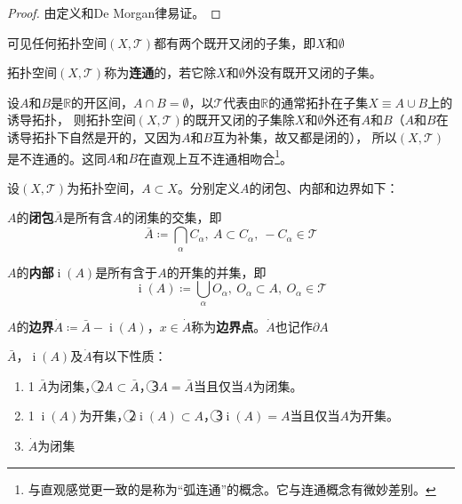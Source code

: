 \begin{proof}
	由定义和De Morgan律易证。
\end{proof}

可见任何拓扑空间$(X, \mathscr{T})$都有两个既开又闭的子集，即$X$和$\emptyset$

\begin{definition}
	拓扑空间$(X, \mathscr{T})$称为\textbf{连通}的，若它除$X$和$\emptyset$外没有既开又闭的子集。
\end{definition}

\begin{example}
	设$A$和$B$是$\mathbb{R}$的开区间，$A \cap B = \emptyset$，以$\mathscr{T}$代表由$\mathbb{R}$的通常拓扑在子集$X \equiv A \cup B$上的诱导拓扑，
	则拓扑空间$(X, \mathscr{T})$的既开又闭的子集除$X$和$\emptyset$外还有$A$和$B$（$A$和$B$在诱导拓扑下自然是开的，又因为$A$和$B$互为补集，故又都是闭的），
	所以$(X, \mathscr{T})$是不连通的。这同$A$和$B$在直观上互不连通相吻合\footnote{
		与直观感觉更一致的是称为``弧连通''的概念。它与连通概念有微妙差别。
	}。
\end{example}

设$(X, \mathscr{T})$为拓扑空间，$A \subset X$。分别定义$A$的闭包、内部和边界如下：

\begin{definition}
	$A$的\textbf{闭包}$\bar{A}$是所有含$A$的闭集的交集，即
	$$\bar{A} \coloneq \bigcap_\alpha C_\alpha, ~ A \subset C_\alpha, ~ -C_\alpha \in \mathscr{T}$$
\end{definition}

\begin{definition}
	$A$的\textbf{内部}$\operatorname{i}(A)$是所有含于$A$的开集的并集，即
	$$\operatorname{i}(A) \coloneq \bigcup_\alpha O_\alpha, ~ O_\alpha \subset A, ~ O_\alpha \in \mathscr{T}$$
\end{definition}

\begin{definition}
	$A$的\textbf{边界}$\dot{A} \coloneq \bar{A} - \operatorname{i}(A)$，$x \in \dot{A}$称为\textbf{边界点}。$\dot{A}$也记作$\partial A$
\end{definition}

\begin{theorem}
	$\bar{A}$，$\operatorname{i}(A)$及$\dot{A}$有以下性质：
	\begin{enumerate}[（a）]
		\item \textcircled{1}$\bar{A}$为闭集，\textcircled{2}$A \subset \bar{A}$，\textcircled{3}$A = \bar{A}$当且仅当$A$为闭集。
		\item \textcircled{1}$\operatorname{i}(A)$为开集，\textcircled{2}$\operatorname{i}(A) \subset A$，\textcircled{3}$\operatorname{i}(A) = A$当且仅当$A$为开集。
		\item $\dot{A}$为闭集
	\end{enumerate}
\end{theorem}

